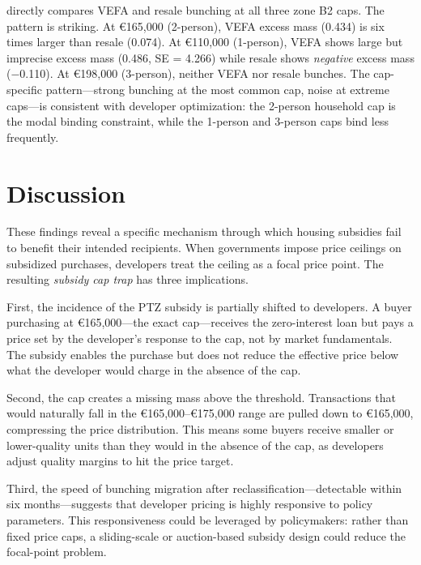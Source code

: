 \documentclass[12pt]{article}
\begin{document}


 directly compares VEFA and resale bunching at all three zone B2 caps. The pattern is striking. At \euro165,000 (2-person), VEFA excess mass (0.434) is six times larger than resale (0.074). At \euro110,000 (1-person), VEFA shows large but imprecise excess mass (0.486, SE = 4.266) while resale shows \textit{negative} excess mass ($-$0.110). At \euro198,000 (3-person), neither VEFA nor resale bunches. The cap-specific pattern---strong bunching at the most common cap, noise at extreme caps---is consistent with developer optimization: the 2-person household cap is the modal binding constraint, while the 1-person and 3-person caps bind less frequently.

\section{Discussion}
\label{sec:discussion}

These findings reveal a specific mechanism through which housing subsidies fail to benefit their intended recipients. When governments impose price ceilings on subsidized purchases, developers treat the ceiling as a focal price point. The resulting \textit{subsidy cap trap} has three implications.

First, the incidence of the PTZ subsidy is partially shifted to developers. A buyer purchasing at \euro165,000---the exact cap---receives the zero-interest loan but pays a price set by the developer's response to the cap, not by market fundamentals. The subsidy enables the purchase but does not reduce the effective price below what the developer would charge in the absence of the cap.

Second, the cap creates a missing mass above the threshold. Transactions that would naturally fall in the \euro165,000--\euro175,000 range are pulled down to \euro165,000, compressing the price distribution. This means some buyers receive smaller or lower-quality units than they would in the absence of the cap, as developers adjust quality margins to hit the price target.

Third, the speed of bunching migration after reclassification---detectable within six months---suggests that developer pricing is highly responsive to policy parameters. This responsiveness could be leveraged by policymakers: rather than fixed price caps, a sliding-scale or auction-based subsidy design could reduce the focal-point problem.
\end{document}
